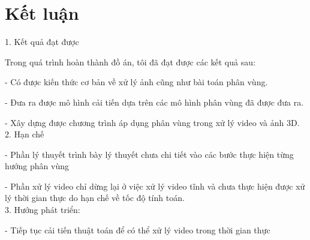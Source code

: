 \documentclass[12pt, oneside, a4paper]{book}
\begin{document}
\chapter*{Kết luận}
1. Kết quả đạt được

Trong quá trình hoàn thành đồ án, tôi đã đạt được các kết quả sau:

- Có được kiến thức cơ bản về xử lý ảnh cũng như bài toán phân vùng.

- Đưa ra được mô hình cải tiến dựa trên các mô hình phân vùng đã được đưa ra.

- Xây dựng được chương trình áp dụng phân vùng trong xử lý video và ảnh 3D.\\
2. Hạn chế

- Phần lý thuyết trình bày lý thuyết chưa chi tiết vào các bước thực hiện từng hướng phân vùng

- Phần xử lý video chỉ dừng lại ở việc xử lý video tĩnh và chưa thực hiện được xử lý thời gian thực do hạn chế về tốc độ tính toán.\\
3. Hướng phát triển:

- Tiếp tục cải tiến thuật toán để có thể xử lý video trong thời gian thực
\end{document}

